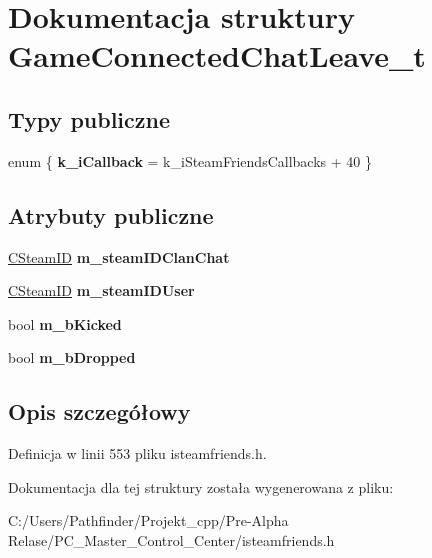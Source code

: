 \hypertarget{struct_game_connected_chat_leave__t}{}\section{Dokumentacja struktury Game\+Connected\+Chat\+Leave\+\_\+t}
\label{struct_game_connected_chat_leave__t}
\subsection*{Typy publiczne}
\begin{DoxyCompactItemize}
\item 
\mbox{\label{struct_game_connected_chat_leave__t_a842bae6e2565f152df1f02175756d8f2}} 
enum \{ {\bfseries k\+\_\+i\+Callback} = k\+\_\+i\+Steam\+Friends\+Callbacks + 40
 \}
\end{DoxyCompactItemize}
\subsection*{Atrybuty publiczne}
\begin{DoxyCompactItemize}
\item 
\mbox{\label{struct_game_connected_chat_leave__t_a16f82e047564da7b8b55ce8265c478fc}} 
\hyperlink{class_c_steam_i_d}{C\+Steam\+ID} {\bfseries m\+\_\+steam\+I\+D\+Clan\+Chat}
\item 
\mbox{\label{struct_game_connected_chat_leave__t_a8e8c555897153307e0447214749f4e04}} 
\hyperlink{class_c_steam_i_d}{C\+Steam\+ID} {\bfseries m\+\_\+steam\+I\+D\+User}
\item 
\mbox{\label{struct_game_connected_chat_leave__t_a0f4c30e4732ea48e8dec36878f6e292e}} 
bool {\bfseries m\+\_\+b\+Kicked}
\item 
\mbox{\label{struct_game_connected_chat_leave__t_a2905e3028f25c9062e295570a6f68fee}} 
bool {\bfseries m\+\_\+b\+Dropped}
\end{DoxyCompactItemize}


\subsection{Opis szczegółowy}


Definicja w linii 553 pliku isteamfriends.\+h.



Dokumentacja dla tej struktury została wygenerowana z pliku\+:\begin{DoxyCompactItemize}
\item 
C\+:/\+Users/\+Pathfinder/\+Projekt\+\_\+cpp/\+Pre-\/\+Alpha Relase/\+P\+C\+\_\+\+Master\+\_\+\+Control\+\_\+\+Center/isteamfriends.\+h\end{DoxyCompactItemize}
